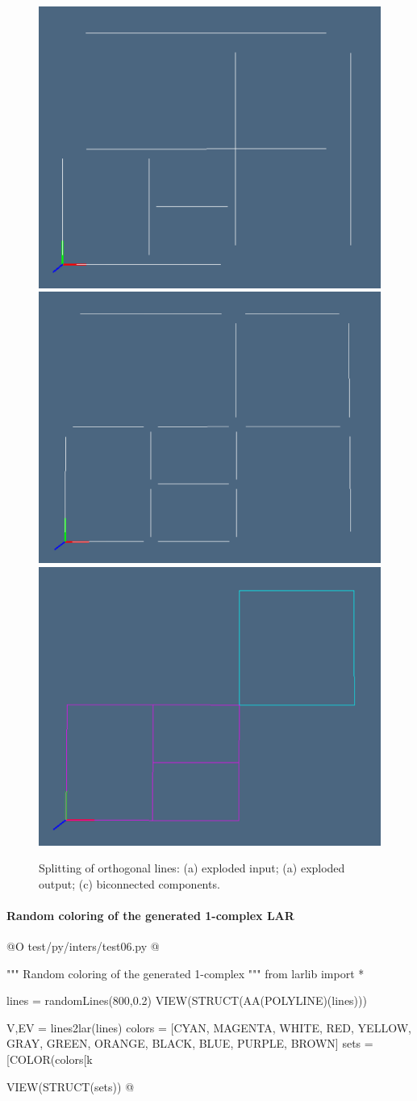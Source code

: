 \documentclass[11pt,oneside]{article}    %
\begin{document}
\begin{figure}[htbp] %
   \centering
   \includegraphics[height=0.25\linewidth,width=0.325\linewidth]{images/ortho1} 
   \includegraphics[height=0.25\linewidth,width=0.325\linewidth]{images/ortho2} 
   \includegraphics[height=0.25\linewidth,width=0.325\linewidth]{images/ortho3} 
   \caption{Splitting of orthogonal lines: (a) exploded input; (a) exploded output; (c) biconnected components.}
   \label{fig:ortho}
\end{figure}



\paragraph{Random coloring of the generated 1-complex LAR}
@O test/py/inters/test06.py
@{""" Random coloring of the generated 1-complex """
from larlib import *

lines = randomLines(800,0.2)
VIEW(STRUCT(AA(POLYLINE)(lines)))

V,EV = lines2lar(lines)
colors = [CYAN, MAGENTA, WHITE, RED, YELLOW, GRAY, GREEN, ORANGE, BLACK, BLUE, PURPLE, BROWN]
sets = [COLOR(colors[k%

VIEW(STRUCT(sets))
@}
\end{document}

